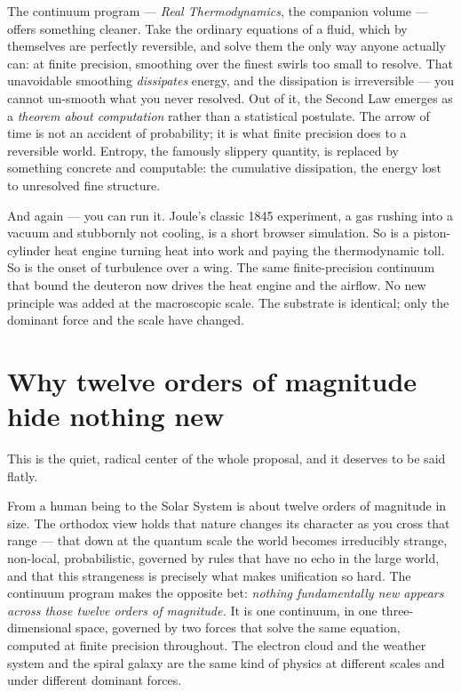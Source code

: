 \documentclass[11pt]{article}
\begin{document}
The continuum program --- \emph{Real Thermodynamics}, the companion volume --- offers something
cleaner. Take the ordinary equations of a fluid, which by themselves are perfectly reversible, and
solve them the only way anyone actually can: at finite precision, smoothing over the finest swirls
too small to resolve. That unavoidable smoothing \emph{dissipates} energy, and the dissipation is
irreversible --- you cannot un-smooth what you never resolved. Out of it, the Second Law emerges as
a \emph{theorem about computation} rather than a statistical postulate. The arrow of time is not an
accident of probability; it is what finite precision does to a reversible world. Entropy, the
famously slippery quantity, is replaced by something concrete and computable: the cumulative
dissipation, the energy lost to unresolved fine structure.

And again --- you can run it. Joule's classic 1845 experiment, a gas rushing into a vacuum and
stubbornly not cooling, is a short browser simulation. So is a piston-cylinder heat engine turning
heat into work and paying the thermodynamic toll. So is the onset of turbulence over a wing. The
same finite-precision continuum that bound the deuteron now drives the heat engine and the airflow.
No new principle was added at the macroscopic scale. The substrate is identical; only the dominant
force and the scale have changed.

\section*{Why twelve orders of magnitude hide nothing new}

This is the quiet, radical center of the whole proposal, and it deserves to be said flatly.

From a human being to the Solar System is about twelve orders of magnitude in size. The orthodox
view holds that nature changes its character as you cross that range --- that down at the quantum
scale the world becomes irreducibly strange, non-local, probabilistic, governed by rules that have
no echo in the large world, and that this strangeness is precisely what makes unification so hard.
The continuum program makes the opposite bet: \emph{nothing fundamentally new appears across those
twelve orders of magnitude.} It is one continuum, in one three-dimensional space, governed by two
forces that solve the same equation, computed at finite precision throughout. The electron cloud
and the weather system and the spiral galaxy are the same kind of physics at different scales and
under different dominant forces.
\end{document}
